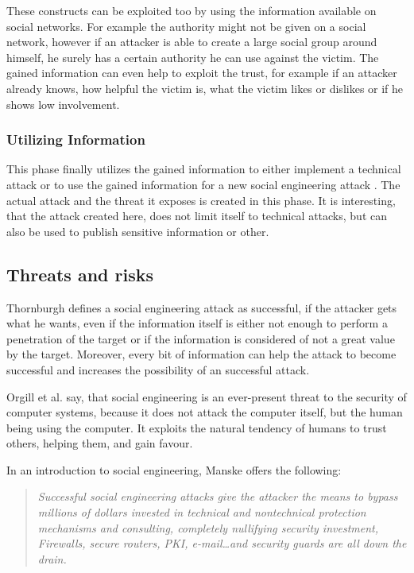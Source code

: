 These constructs can be exploited too by using the information available on
social networks. For example the authority might not be given on a social
network, however if an attacker is able to create a large social group around
himself, he surely has a certain authority he can use against the victim. The
gained information can even help to exploit the trust, for example if an
attacker already knows, how helpful the victim is, what the victim likes or
dislikes or if he shows low involvement.

\subsubsection{Utilizing Information}

This phase finally utilizes the gained information to either implement a
technical attack or to use the gained information for a new social engineering
attack \cite{thornburgh2004}. The actual attack and the threat it exposes is
created in this phase. It is interesting, that the attack created here, does
not limit itself to technical attacks, but can also be used to publish
sensitive information or other.

\subsection{Threats and risks}

Thornburgh \cite{thornburgh2004} defines a social engineering attack as
successful, if the attacker gets what he wants, even if the information itself
is either not enough to perform a penetration of the target or if the
information is considered of not a great value by the target. Moreover, every
bit of information can help the attack to become successful and increases the
possibility of an successful attack.

Orgill et al. \cite{orgill2004} say, that social engineering is an ever-present
threat to the security of computer systems, because it does not attack the
computer itself, but the human being using the computer. It exploits the
natural tendency of humans to trust others, helping them, and gain favour.

In an introduction to social engineering, Manske \cite{manske2000} offers the following:

\begin{quote}
\textit{Successful social engineering attacks give the attacker the means to bypass
millions of dollars invested in technical and nontechnical protection
mechanisms and consulting, completely nullifying security investment,
Firewalls, secure routers, PKI, e-mail\dots and security guards are all down
the drain.}
\end{quote}

